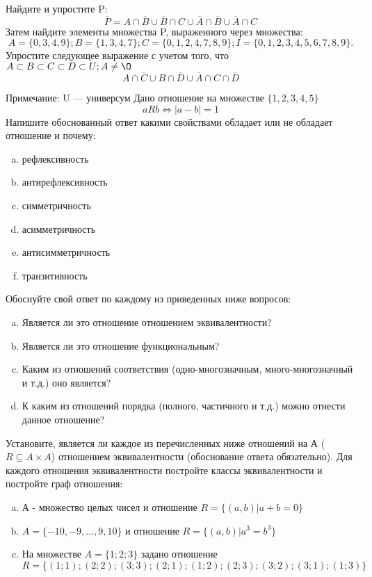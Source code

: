\documentclass[10pt]{exam}
\begin{document}
\begin{questions}
\question
Найдите и упростите P:
\begin{equation*}
\overline{P} = A \cap \overline{B} \cup \overline{B} \cap C \cup \overline{A} \cap \overline{B} \cup \overline{A} \cap C
\end{equation*}
Затем найдите элементы множества P, выраженного через множества:
\begin{equation*}
A = \{0, 3, 4, 9\}; 
B = \{1, 3, 4, 7\};
C = \{0, 1, 2, 4, 7, 8, 9\};
I = \{0, 1, 2, 3, 4, 5, 6, 7, 8, 9\}.
\end{equation*}\question
Упростите следующее выражение с учетом того, что $A\subset B \subset C \subset D \subset U; A \neq \O$
\begin{equation*}
A \cap  \overline{C} \cup B \cap \overline{D} \cup  \overline{A} \cap C \cap  \overline{D}
\end{equation*}

Примечание: U — универсум\question
Дано отношение на множестве $\{1, 2, 3, 4, 5\}$ 
\begin{equation*}
aRb \iff |a-b| = 1
\end{equation*}
Напишите обоснованный ответ какими свойствами обладает или не обладает отношение и почему:   
\begin{enumerate} [a)]\setcounter{enumi}{0}
\item рефлексивность
\item антирефлексивность
\item симметричность
\item асимметричность
\item антисимметричность
\item транзитивность
\end{enumerate}

Обоснуйте свой ответ по каждому из приведенных ниже вопросов:
\begin{enumerate} [a)]\setcounter{enumi}{0}
    \item Является ли это отношение отношением эквивалентности?
    \item Является ли это отношение функциональным?
    \item Каким из отношений соответствия (одно-многозначным, много-многозначный и т.д.) оно является?
    \item К каким из отношений порядка (полного, частичного и т.д.) можно отнести данное отношение?
\end{enumerate}

\question
Установите, является ли каждое из перечисленных ниже отношений на А ($R \subseteq A \times A$) отношением эквивалентности (обоснование ответа обязательно). Для каждого отношения эквивалентности 
постройте классы эквивалентности и постройте граф отношения:
\begin{enumerate}[a)]\setcounter{enumi}{0}
\item А - множество целых чисел и отношение $R = \{(a,b)|a + b = 0\}$
\item $A = \{-10, -9, …, 9, 10\}$ и отношение $R = \{(a,b)|a^{3} = b^{3}\}$
\item На множестве $A = \{1; 2; 3\}$ задано отношение $R = \{(1; 1); (2; 2); (3; 3); (2; 1); (1; 2); (2; 3); (3; 2); (3; 1); (1; 3)\}$


\end{enumerate}
\end{questions}
\end{document}
